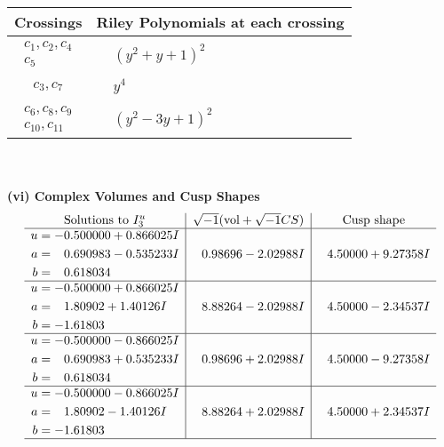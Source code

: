 \documentclass[1p]{elsarticle_modified}
\theoremstyle{definition}
\newcommand{\I}{\sqrt{-1}}
\begin{document}
\begin{tabular}{m{50pt}|m{274pt}}
Crossings & \hspace{64pt}Riley Polynomials at each crossing \\
\hline $$\begin{aligned}c_{1},c_{2},c_{4}\\c_{5}\end{aligned}$$&$\begin{aligned}
&(y^2+y+1)^2
\end{aligned}$\\
\hline $$\begin{aligned}c_{3},c_{7}\end{aligned}$$&$\begin{aligned}
&y^4
\end{aligned}$\\
\hline $$\begin{aligned}c_{6},c_{8},c_{9}\\c_{10},c_{11}\end{aligned}$$&$\begin{aligned}
&(y^2-3 y+1)^2
\end{aligned}$\\
\hline
\end{tabular}\\~\\
\newpage\flushleft \textbf{(vi) Complex Volumes and Cusp Shapes}
$$\begin{array}{c|c|c}  
\text{Solutions to }I^u_{3}& \I (\text{vol} + \sqrt{-1}CS) & \text{Cusp shape}\\
 \hline 
\begin{aligned}
u &= -0.500000 + 0.866025 I \\
a &= \phantom{-}0.690983 - 0.535233 I \\
b &= \phantom{-}0.618034\phantom{ +0.000000I}\end{aligned}
 & \phantom{-}0.98696 - 2.02988 I & \phantom{-}4.50000 + 9.27358 I \\ \hline\begin{aligned}
u &= -0.500000 + 0.866025 I \\
a &= \phantom{-}1.80902 + 1.40126 I \\
b &= -1.61803\phantom{ +0.000000I}\end{aligned}
 & \phantom{-}8.88264 - 2.02988 I & \phantom{-}4.50000 - 2.34537 I \\ \hline\begin{aligned}
u &= -0.500000 - 0.866025 I \\
a &= \phantom{-}0.690983 + 0.535233 I \\
b &= \phantom{-}0.618034\phantom{ +0.000000I}\end{aligned}
 & \phantom{-}0.98696 + 2.02988 I & \phantom{-}4.50000 - 9.27358 I \\ \hline\begin{aligned}
u &= -0.500000 - 0.866025 I \\
a &= \phantom{-}1.80902 - 1.40126 I \\
b &= -1.61803\phantom{ +0.000000I}\end{aligned}
 & \phantom{-}8.88264 + 2.02988 I & \phantom{-}4.50000 + 2.34537 I\\
 \hline 
 \end{array}$$\newpage
\end{document}
